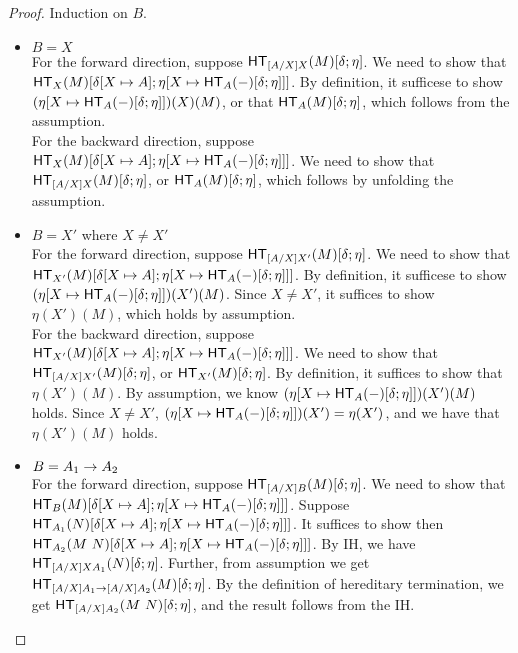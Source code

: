 \documentclass{article}
\begin{document}
\begin{proof}
Induction on $B$.
\begin{itemize}
\setlength\itemsep{1em}
\item $B = X$\\
For the forward direction, suppose $\mathsf{HT}_{[A/X]X}(M)[\delta;\eta]$. We need to show that  
$\mathsf{HT}_{X}(M)[\delta[X \mapsto A];\eta[X \mapsto \mathsf{HT}_{A}(-)[\delta;\eta]]]$. By definition, it sufficese to show
$(\eta[X \mapsto \mathsf{HT}_{A}(-)[\delta;\eta]])(X)(M)$, or that $\mathsf{HT}_{A}(M)[\delta;\eta]$, which follows from the 
assumption.\\

For the backward direction, suppose $\mathsf{HT}_{X}(M)[\delta[X \mapsto A];\eta[X \mapsto \mathsf{HT}_{A}(-)[\delta;\eta]]]$. 
We need to show that $\mathsf{HT}_{[A/X]X}(M)[\delta;\eta]$, or $\mathsf{HT}_{A}(M)[\delta;\eta]$, which follows by unfolding
the assumption. 

\item $B = X'$ where $X \ne X'$\\ 
For the forward direction, suppose $\mathsf{HT}_{[A/X]X'}(M)[\delta;\eta]$. We need to show that  
$\mathsf{HT}_{X'}(M)[\delta[X \mapsto A];\eta[X \mapsto \mathsf{HT}_{A}(-)[\delta;\eta]]]$. By definition, it sufficese to show
$(\eta[X \mapsto \mathsf{HT}_{A}(-)[\delta;\eta]])(X')(M)$. Since $ X \ne X'$, 
it suffices to show $\eta(X')(M)$, which holds by assumption. \\

For the backward direction, suppose $\mathsf{HT}_{X'}(M)[\delta[X \mapsto A];\eta[X \mapsto \mathsf{HT}_{A}(-)[\delta;\eta]]]$. 
We need to show that $\mathsf{HT}_{[A/X]X'}(M)[\delta;\eta]$, or $\mathsf{HT}_{X'}(M)[\delta;\eta]$. By definition, it suffices
to show that $\eta(X')(M)$. By assumption, we know $(\eta[X \mapsto \mathsf{HT}_{A}(-)[\delta;\eta]])(X')(M)$ holds. Since
$X \ne X'$, $(\eta[X \mapsto \mathsf{HT}_{A}(-)[\delta;\eta]])(X') = \eta(X')$, and we have that $\eta(X')(M)$ holds.

\item $B = A_1 \to A_2$\\
For the forward direction, suppose $\mathsf{HT}_{[A/X]B}(M)[\delta;\eta]$. We need to show that  
$\mathsf{HT}_{B}(M)[\delta[X \mapsto A];\eta[X \mapsto \mathsf{HT}_{A}(-)[\delta;\eta]]]$. 
Suppose $\mathsf{HT}_{A_1}(N)[\delta[X \mapsto A];\eta[X \mapsto \mathsf{HT}_{A}(-)[\delta;\eta]]]$. It suffices to show
then $\mathsf{HT}_{A_2}(M\ N)[\delta[X \mapsto A];\eta[X \mapsto \mathsf{HT}_{A}(-)[\delta;\eta]]]$. 
By IH, we have $\mathsf{HT}_{[A/X]XA_1}(N)[\delta;\eta]$. Further, from assumption we get
$\mathsf{HT}_{[A/X]A_1 \to [A/X]A_2}(M)[\delta;\eta]$. By the definition of hereditary termination, we get 
$\mathsf{HT}_{[A/X]A_2}(M\ N)[\delta;\eta]$, and the result follows from the IH.


\end{itemize}
\end{proof}
\end{document}
